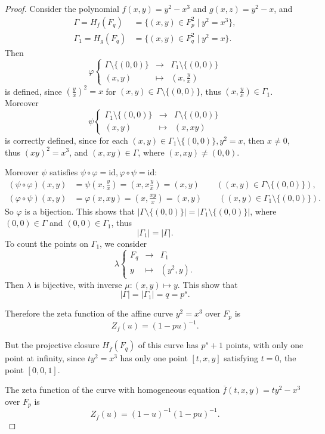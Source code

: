 \documentclass[11pt,a4paper]{article}
\begin{document}
\begin{proof}
Consider the polynomial $f(x,y) = y^2 - x^3$ and $g(x,z) = y^2 - x$, and
\begin{align*}
\Gamma =H_f(F_q) &= \{(x,y) \in F_p^2 \mid y^2 = x^3\},\\
\Gamma_1 = H_g(F_q) &= \{(x,y)\in F_q^2 \mid y^2 = x\}.
\end{align*}
Then 
$$
\varphi
\left\{
\begin{array}{ccl}
\Gamma \setminus \{(0,0)\}  & \to &\Gamma_1\setminus \{(0,0)\} \\
(x,y) & \mapsto & \left(x,\frac{y}{x} \right)
\end{array}
\right.
$$
is defined, since $\left(\frac{y}{x} \right) ^2 = x$ for $(x,y) \in \Gamma \setminus \{(0,0)\}$, thus $ \left(x,\frac{y}{x} \right) \in \Gamma_1$.
Moreover
$$
\psi
\left\{
\begin{array}{ccl}
 \Gamma_1\setminus \{(0,0)\} & \to & \Gamma \setminus \{(0,0)\} \\
(x,y) & \mapsto & \left(x,xy \right)
\end{array}
\right.
$$
is correctly defined, since for each $(x,y) \in \Gamma_1\setminus \{(0,0)\}, y^2 = x$, then $x \ne 0$, thus $(xy)^2 =x^3$, and $(x,xy) \in \Gamma$, where $(x,xy) \ne (0,0)$.

Moreover $\psi$ satisfies $\psi \circ \varphi = \mathrm{id}, \varphi \circ \psi = \mathrm{id}$:
\begin{align*}
(\psi \circ \varphi)(x,y) &= \psi\left(x,\frac{y}{x} \right) =\left (x, x \frac{y}{x}\right) = (x,y) \qquad ((x,y) \in \Gamma \setminus \{(0,0)\}),\\
(\varphi \circ \psi)(x,y) &= \varphi(x,xy) = \left( x, \frac{xy}{x} \right) = (x,y) \qquad ((x,y) \in \Gamma_1 \setminus \{(0,0)\}).
\end{align*}
So $\varphi$ is a bijection. This shows that $| \Gamma \setminus \{(0,0)\} | =  |\Gamma_1\setminus \{(0,0)\}|$, where $(0,0) \in \Gamma$ and $(0,0) \in \Gamma_1$, thus
$$|\Gamma_1| = |\Gamma|.$$ 
To count the points on $\Gamma_1$, we consider
$$\lambda
\left\{
\begin{array}{ccl}
F_q & \to & \Gamma_1\\
y & \mapsto & (y^2,y).
\end{array}
\right.
$$
Then $\lambda$ is bijective, with inverse $\mu : (x,y) \mapsto y$. This show that $$|\Gamma| = |\Gamma_1| = q = p^s.$$

Therefore the zeta function of the affine curve $y^2 = x^3$ over $F_p$ is 
$$Z_f(u) = (1-pu)^{-1}.$$

But the projective closure $H_{\overline{f}}(F_q)$ of this curve has $p^s + 1$ points, with only one point at infinity, since $ty^2 = x^3$ has only one point $[t,x,y]$ satisfying $t= 0$, the point $[0,0,1]$.

The zeta function of the curve with homogeneous equation $\overline{f}(t,x,y) = ty^2 - x^3$ over $F_p$ is 
$$Z_{\overline{f}}(u) = (1-u)^{-1} (1-pu)^{-1}.$$
\end{proof}
\end{document}
